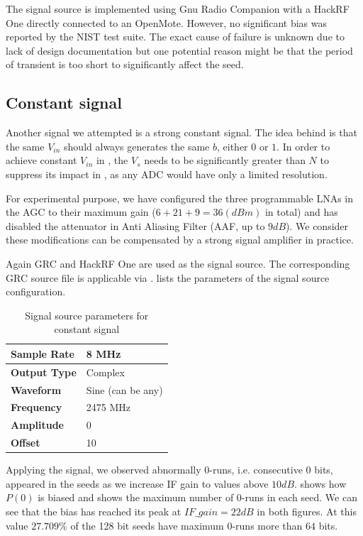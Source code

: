 The signal source is implemented using Gnu Radio Companion\cite{GRC} with a HackRF One\cite{HackRFOne} directly connected to an OpenMote\cite{OpenMote}. However, no significant bias was reported by the NIST test suite. The exact cause of failure is unknown due to lack of design documentation but one potential reason might be that the period of transient is too short to significantly affect the seed.

\subsection{Constant signal} \label{Constant}
Another signal we attempted is a strong constant signal. The idea behind is that the same $V_{in}$ should always generates the same $b$, either $0$ or $1$. In order to achieve constant $V_{in}$ in , the $V_s$ needs to be significantly greater than $N$ to suppress its impact in , as any ADC would have only a limited resolution.

For experimental purpose, we have configured the three programmable LNAs in the AGC to their maximum gain ($6 + 21 + 9 = 36(dBm)$ in total) and has disabled the attenuator in Anti Aliasing Filter (AAF, up to $9dB$). We consider these modifications can be compensated by a strong signal amplifier in practice.

Again GRC and HackRF One are used as the signal source. The corresponding GRC source file is applicable via \cite{prngtest}.  lists the parameters of the signal source configuration.

\begin{table}[!t]
\caption{Signal source parameters for constant signal}
\label{ConstantSignal}
\centering
\begin{tabular}{|l|l|}
\hline
\textbf{Sample Rate} & 8 MHz             \\ \hline
\textbf{Output Type} & Complex           \\ \hline
\textbf{Waveform}    & Sine (can be any) \\ \hline
\textbf{Frequency}   & 2475 MHz          \\ \hline
\textbf{Amplitude}   & 0                 \\ \hline
\textbf{Offset}      & 10                \\ \hline
\end{tabular}
\end{table}

Applying the signal, we observed abnormally 0-runs, i.e. consecutive $0$ bits, appeared in the seeds as we increase IF gain to values above $10dB$.  shows how $P(0)$ is biased and  shows the maximum number of 0-runs in each seed. We can see that the bias has reached its peak at $IF\_gain = 22dB$ in both figures. At this value $27.709\%$ of the 128 bit seeds have maximum 0-runs more than $64$ bits.

